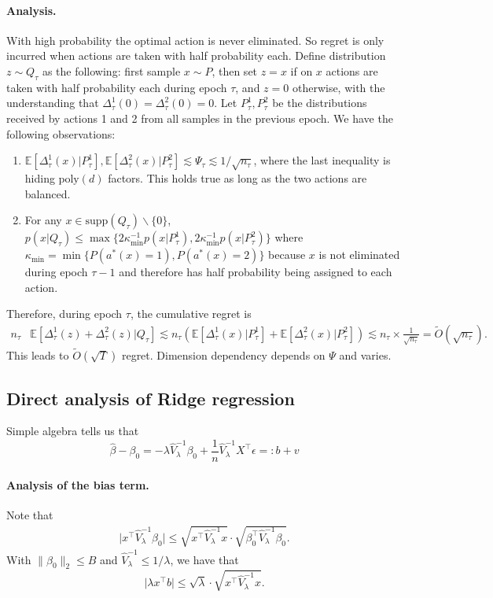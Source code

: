 \documentclass[11pt,a4paper]{article}
\renewcommand{\hat}{\widehat}
\renewcommand{\tilde}{\widetilde}
\theoremstyle{definition}
\theoremstyle{plain}
\theoremstyle{remark}
\newcommand{\supp}{\mathrm{supp}}
\begin{document}
\paragraph{Analysis.} With high probability the optimal action is never eliminated. So regret is only incurred when actions are taken with half probability each. 
Define distribution $z\sim Q_\tau$ as the following: first sample $x\sim P$, then set $z=x$ if on $x$ actions are taken with half probability each during epoch $\tau$, and $z=0$ otherwise, with the understanding that $\Delta_\tau^1(0)=\Delta_\tau^2(0)=0$.
Let $P_\tau^1,P_\tau^2$ be the distributions received by actions 1 and 2 from all samples in the previous epoch.
We have the following observations:
\begin{enumerate}
\item $\mathbb E[\Delta_\tau^1(x)|P_\tau^1],\mathbb E[\Delta_\tau^2(x)|P_\tau^2]\lesssim \Psi_\tau \lesssim 1/\sqrt{n_\tau}$, where the last inequality is hiding $\mathrm{poly}(d)$ factors. This holds true as long as the two actions are balanced.
\item For any $x\in\supp(Q_\tau)\backslash\{0\}$, $p(x|Q_\tau)\leq \max\{2\kappa_{\min}^{-1}p(x|P_\tau^1),2\kappa_{\min}^{-1}p(x|P_\tau^2)\}$ where $\kappa_{\min}=\min\{P(a^*(x)=1),P(a^*(x)=2)\}$ because $x$ is not eliminated during epoch $\tau-1$ and therefore has half probability being assigned to each action.
\end{enumerate}

Therefore, during epoch $\tau$, the cumulative regret is
\begin{align*}
n_\tau&\mathbb E[\Delta_\tau^1(z)+\Delta_\tau^2(z)|Q_\tau] \lesssim n_\tau(\mathbb E[\Delta_\tau^1(x)|P_\tau^1] + \mathbb E[\Delta_\tau^2(x)|P_\tau^2]) \lesssim n_\tau\times \frac{1}{\sqrt{n_\tau}} = \tilde O(\sqrt{n_\tau}).
\end{align*}
This leads to $\tilde O(\sqrt{T})$ regret. Dimension dependency depends on $\Psi$ and varies.

\subsection{Direct analysis of Ridge regression}

Simple algebra tells us that
$$
\hat\beta-\beta_0 = -\lambda \hat V_\lambda^{-1}\beta_0 + \frac{1}{n}\hat V_\lambda^{-1}X^\top\epsilon =: b+v
$$

\paragraph{Analysis of the bias term.}
Note that
\begin{align*}
\big|x^\top\hat V_\lambda^{-1}\beta_0\big| \leq \sqrt{x^\top\hat V_\lambda^{-1} x}\cdot \sqrt{\beta_0^\top\hat V_\lambda^{-1}\beta_0}.
\end{align*}
With $\|\beta_0\|_2\leq B$ and $\hat V_\lambda^{-1}\leq1/\lambda$, we have that
$$
\big|\lambda x^\top b\big| \leq \sqrt{\lambda}\cdot \sqrt{x^\top\hat V_\lambda^{-1}x}.
$$
\end{document}
